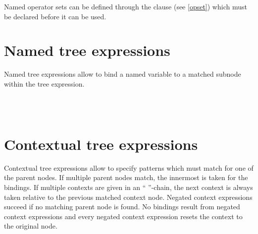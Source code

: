 \noindent
Named operator sets can be defined through the  clause
(see \ref{opset}) which must be declared before it can be used.

\section{Named tree expressions}

Named tree expressions allow to bind a named variable to a
matched subnode within the tree expression.

\begin{grammar}
      \produces {} \\
      \produces {} 
	  \\
\end{grammar}

\section{Contextual tree expressions}

Contextual tree expressions allow to specify patterns which must
match for one of the parent nodes. If multiple parent nodes match,
the innermost is taken for the bindings. If multiple contexts
are given in an `` ''-chain, the
next context is always taken relative to the previous matched context node.
Negated context expressions succeed if no matching parent node is
found. No bindings result from negated context expressions and
every negated context expression resets the context to the original node.

\begin{grammar}
      \produces {} \\
      \produces {}
	   \\
      \produces {}
	 \lextoken{!}   \\
      \produces {} \\
      \produces {}
	    \\
      \produces {}
	  \lextoken{!} 
	  \\
      \produces {} \\
\end{grammar}

